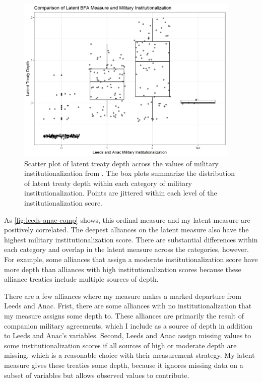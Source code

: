 \documentclass[12pt]{article}
\begin{document}
\begin{figure}[htbp]
	\centering
		\includegraphics[width=0.95\textwidth]{leeds-anac-comp.png}
	\caption{Scatter plot of latent treaty depth across the values of military institutionalization from \citet{LeedsAnac2005}. The box plots summarize the distribution of latent treaty depth within each category of military institutionalization. Points are jittered within each level of the institutionalization score.}
	\label{fig:leeds-anac-comp}
\end{figure}


As \autoref{fig:leeds-anac-comp} shows, this ordinal measure and my latent measure are positively correlated. 
The deepest alliances on the latent measure also have the highest military institutionalization score. 
There are substantial differences within each category and overlap in the latent measure across the categories, however. 
For example, some alliances that \citet{LeedsAnac2005} assign a moderate institutionalization score have more depth than alliances with high institutionalization scores because these alliance treaties include multiple sources of depth. 


There are a few alliances where my measure makes a marked departure from Leeds and Anac. 
Frist, there are some alliances with no institutionalization that my measure assigns some depth to. 
These alliances are primarily the result of companion military agreements, which I include as a source of depth in addition to Leeds and Anac's variables. 
Second, Leeds and Anac assign missing values to some institutionalization scores if all sources of high or moderate depth are missing, which is a reasonable choice with their measurement strategy.
My latent measure gives these treaties some depth, because it ignores missing data on a subset of variables but allows observed values to contribute. 
\end{document}
